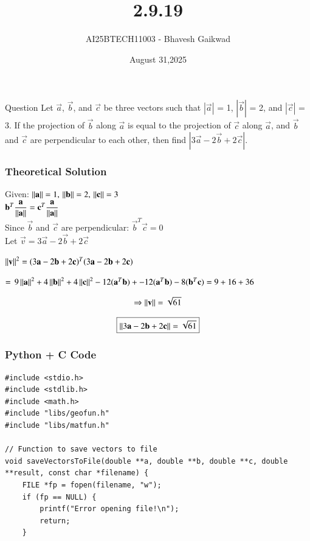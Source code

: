 \documentclass{beamer}
\title
{2.9.19}
\date{August 31,2025}
\author 
{AI25BTECH11003 - Bhavesh Gaikwad}
\begin{document}
\frame{\titlepage}
\begin{frame}{Question}
 Let $\overrightarrow{a}$,
$\overrightarrow{b}$, and $\overrightarrow{c}$ be three vectors such that $|\overrightarrow{a}|$ = 1, $|\overrightarrow{b}|$ = 2, and $|\overrightarrow{c}|$ = 3. If the
projection of $\overrightarrow{b}$ along $\overrightarrow{a}$ is equal to the projection of $\overrightarrow{c}$ along $\overrightarrow{a}$, and $\overrightarrow{b}$ and $\overrightarrow{c}$ are perpendicular to each other, then find $|3\overrightarrow{a} - 2\overrightarrow{b} + 2\overrightarrow{c}|$.
\end{frame}


\begin{frame}[fragile]
    \frametitle{Theoretical Solution}
Given: $\left\lVert\mathbf{a}\right\rVert = 1, \, \left\lVert\mathbf{b}\right\rVert = 2, \, \left\lVert\mathbf{c}\right\rVert = 3$\\

$\mathbf{b}^T\dfrac{\mathbf{a}}{\left\lVert\mathbf{a}\right\rVert} = \mathbf{c}^T\dfrac{\mathbf{a}}{\left\lVert\mathbf{a}\right\rVert}$\\

Since $\vec{b}$ and $\vec{c}$ are perpendicular: $\vec{b}^T\vec{c} = 0$ \\

Let $\vec{v} = 3\vec{a} - 2\vec{b} + 2\vec{c}$

$\left\lVert\mathbf{v}\right\rVert^2 = (3\mathbf{a} - 2\mathbf{b} + 2\mathbf{c})^T(3\mathbf{a} - 2\mathbf{b} + 2\mathbf{c})$

$=\, 9\left\lVert\mathbf{a}\right\rVert^2 + 4\left\lVert\mathbf{b}\right\rVert^2 + 4\left\lVert\mathbf{c}\right\rVert^2 -12(\mathbf{a}^T\mathbf{b}) + -12(\mathbf{a}^T\mathbf{b}) - 8(\mathbf{b}^T\mathbf{c})
= 9 + 16 + 36$

\begin{align}
    \centering
\Rightarrow
    \norm{\vec{v}} = \sqrt{61}
\end{align}

\begin{align}
\centering
\boxed{\norm{3\vec{a} - 2\vec{b} + 2\vec{c}} = \sqrt{61}}
\end{align}
\end{frame}


\begin{frame}[fragile]
    \frametitle{Python + C Code}
    \begin{lstlisting}
#include <stdio.h>
#include <stdlib.h>
#include <math.h>
#include "libs/geofun.h"
#include "libs/matfun.h"

// Function to save vectors to file
void saveVectorsToFile(double **a, double **b, double **c, double **result, const char *filename) {
    FILE *fp = fopen(filename, "w");
    if (fp == NULL) {
        printf("Error opening file!\n");
        return;
    }
    \end{lstlisting}
\end{frame}
\end{document}
